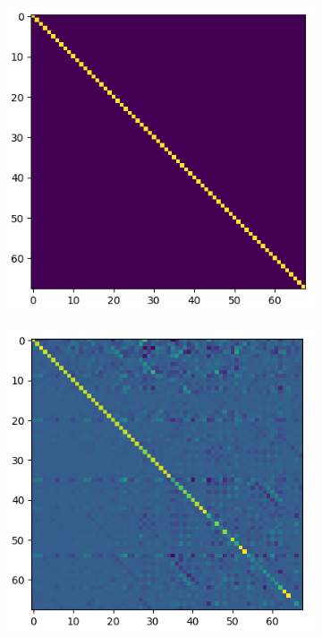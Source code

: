 \begin{figure}[h]
	\centering
	\begin{subfigure}{0.45\textwidth}
		\centering
		\includegraphics[width=0.8\linewidth, scale=0.5]{./images/characterisation_assay_ideal.png}
		\caption{}
		\label{fig:characterisation_assay_ideal}
	\end{subfigure}
	\begin{subfigure}{0.45\textwidth}
		\centering
		\includegraphics[width=1\linewidth, scale=0.5]{./images/characterisation_assay_real.png}

\end{subfigure}
\end{figure}
